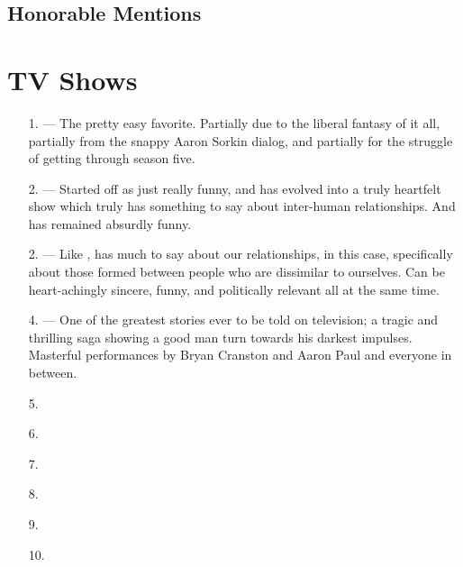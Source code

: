 \documentclass[../butidigress.tex]{subfiles}
\begin{document}
\subsection{Honorable Mentions}

\section{TV Shows}\label{sec:tvshowstopten}
\begin{itemize}
    \item[1.] \textbf{} --- The pretty easy favorite. Partially due to the liberal fantasy of it all, partially from the snappy Aaron Sorkin dialog, and partially for the struggle of getting through season five.
    \item[2.] \textbf{} --- Started off as just really funny, and has evolved into a truly heartfelt show which truly has something to say about inter-human relationships. And has remained absurdly funny.
    \item[2.] \textbf{} --- Like ,  has much to say about our relationships, in this case, specifically about those formed between people who are dissimilar to ourselves. Can be heart-achingly sincere, funny, and politically relevant all at the same time.
    \item[4.] \textbf{} --- One of the greatest stories ever to be told on television; a tragic and thrilling saga showing a good man turn towards his darkest impulses. Masterful performances by Bryan Cranston and Aaron Paul and everyone in between.
    \item[5.] \textbf{}
    \item[6.] \textbf{}
    \item[7.] \textbf{}
    \item[8.] \textbf{}
    \item[9.] \textbf{}
    \item[10.] \textbf{}
\end{itemize}
\end{document}
